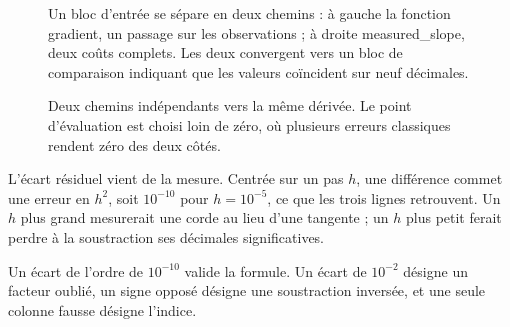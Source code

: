 \begin{figure}[htbp]
\centering
\begin{graphique}{Un bloc d'entrée se sépare en deux chemins : à gauche la fonction gradient, un passage sur les observations ; à droite measured_slope, deux coûts complets. Les deux convergent vers un bloc de comparaison indiquant que les valeurs coïncident sur neuf décimales.}
\end{graphique}
\caption{Deux chemins indépendants vers la même dérivée. Le point d'évaluation
est choisi loin de zéro, où plusieurs erreurs classiques rendent zéro des deux
côtés.}
\label{fig:controle-gradient}
\end{figure}
\FloatBarrier

L'écart résiduel vient de la mesure. Centrée sur un pas $h$, une différence
commet une erreur en $h^2$, soit $10^{-10}$ pour $h=10^{-5}$, ce que les trois
lignes retrouvent. Un $h$ plus grand mesurerait une corde au lieu d'une tangente ;
un $h$ plus petit ferait perdre à la soustraction ses décimales significatives.

\begin{vigilance}
Un écart de l'ordre de $10^{-10}$ valide la formule. Un écart de $10^{-2}$
désigne un facteur oublié, un signe opposé désigne une soustraction inversée, et
une seule colonne fausse désigne l'indice.
\end{vigilance}

